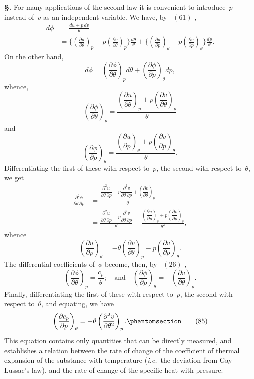 \documentclass[12pt]{book}[2005/09/16]
\newcommand{\Chg}[2]{#2}
\newcommand{\Add}[1]{\Chg{}{#1}}
\newcommand{\Section}[1]{
  \medskip\par\textbf{§\;#1}
  \label{section:#1}
}
\newcommand{\Tag}[1]{%
  \phantomsection\label{eqn:#1}\tag*{\ensuremath{#1}}%
}
\newcommand{\Eq}[1]{%
  \hyperref[eqn:#1]{\ensuremath{#1}}%
}
\newcommand{\PageSep}[1]{\ignorespaces}
\newcommand{\ie}{\emph{i.e.}}
\newcommand{\dd}{\partial}
\begin{document}
\Section{157.} For many applications of the second law it is
\PageSep{123}
%
%
%
%
convenient to introduce~$p$ instead of~$v$ as an independent
variable. We have, by~\Eq{(61)},
\begin{align*}
d\phi &= \frac{du + p\, dv}{\theta} \\
  &= \biggl\{\left(\frac{\dd u}{\dd \theta}\right)_{p} + p\left(\frac{\dd v}{\dd \theta}\right)_{p}\biggr\} \frac{d\theta}{\theta}
  + \biggl\{\left(\frac{\dd u}{\dd p}\right)_{\theta} + p\left(\frac{\dd v}{\dd p}\right)_{\theta}\biggr\} \frac{dp}{\theta}\Add{.}
\end{align*}
On the other hand,
\[
d\phi = \left(\frac{\dd \phi}{\dd \theta}\right)_{p} d\theta + \left(\frac{\dd \phi}{\dd p}\right)_{\theta} dp\Add{,}
\]
whence,
\[
\left(\frac{\dd \phi}{\dd \theta}\right)_{p}
  = \frac{\left(\dfrac{\dd u}{\dd \theta}\right)_{p} + p\left(\dfrac{\dd v}{\dd \theta}\right)_{p}}{\theta}
\]
and
\[
\left(\frac{\dd \phi}{\dd p}\right)_{\theta}
  = \frac{\left(\dfrac{\dd u}{\dd p}\right)_{\theta} + p\left(\dfrac{\dd v}{\dd p}\right)_{\theta}}{\theta}\Add{.}
\]
Differentiating the first of these with respect to~$p$, the
second with respect to~$\theta$, we get
\begin{align*}
\frac{\dd^{2} \phi}{\dd \theta\, \dd p}
  &= \frac{\dfrac{\dd^{2} u}{\dd \theta\, \dd p} + p \dfrac{\dd^{2} v}{\dd \theta\, \dd p} + \left(\dfrac{\dd v}{\dd \theta}\right)_{p}}{\theta} \\
  &= \frac{\dfrac{\dd^{2} u}{\dd \theta\, \dd p} + p \dfrac{\dd^{2} v}{\dd \theta\, \dd p}}{\theta} - \frac{\left(\dfrac{\dd u}{\dd p}\right)_{\theta} + p\left(\dfrac{\dd v}{\dd p}\right)_{\theta}}{\theta^{2}}\Add{,}
\end{align*}
whence
\[
\left(\frac{\dd u}{\dd p}\right)_{\theta}
  = -\theta \left(\frac{\dd v}{\dd \theta}\right)_{p} - p\left(\frac{\dd v}{\dd p}\right)_{\theta}.
\]
The differential coefficients of~$\phi$ become, then, by~\Eq{(26)},
\[
\left(\frac{\dd \phi}{\dd \theta}\right)_{p} = \frac{c_{p}}{\theta};
\quad\text{and}\quad
\left(\frac{\dd \phi}{\dd p}\right)_{\theta} = -\left(\frac{\dd v}{\dd \theta}\right)_{p}.
\]
Finally, differentiating the first of these with respect to~$p$,
the second with respect to~$\theta$, and equating, we have
\[
\left(\frac{\dd c_{p}}{\dd p}\right)_{\theta} = -\theta \left(\frac{\dd^{2} v}{\dd \theta^{2}}\right)_{p}\Add{.}
\Tag{(85)}
\]
This equation contains only quantities that can be directly
measured, and establishes a relation between the rate of
change of the coefficient of thermal expansion of the substance
with temperature (\ie\ the deviation from Gay-Lussac's
\PageSep{124}
law), and the rate of change of the specific heat with
pressure.
\end{document}
